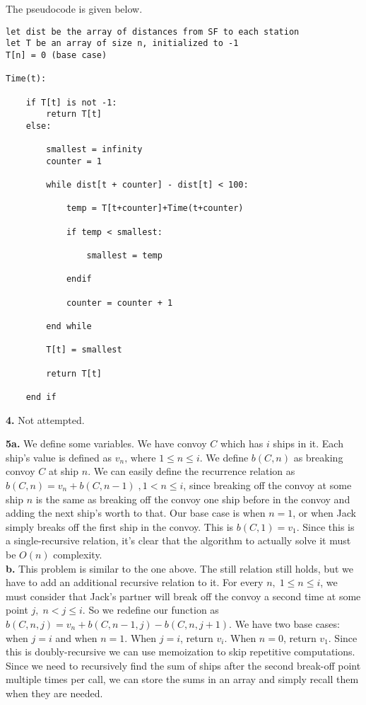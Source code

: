 \documentclass[12pt]{report}
\newcommand{\no}{\noindent}
\begin{document}
	\pagebreak

	\no The pseudocode is given below.
	
	\begin{lstlisting}
let dist be the array of distances from SF to each station 
let T be an array of size n, initialized to -1
T[n] = 0 (base case)

Time(t):

	if T[t] is not -1:
		return T[t]
	else:
		
		smallest = infinity
		counter = 1
		
		while dist[t + counter] - dist[t] < 100:
		
			temp = T[t+counter]+Time(t+counter)
			
			if temp < smallest:
				
				smallest = temp
				
			endif
			
			counter = counter + 1
			
		end while
		
		T[t] = smallest
		
		return T[t]
		
	end if
	\end{lstlisting}

	\no \textbf{4.} Not attempted.\\
	
	\pagebreak
	
	\no \textbf{5a.} We define some variables. We have convoy $C$ which has $i$ ships in it. Each ship's value is defined as $v_n\text{, where }1 \leq n \leq i.$ We define $b(C,n)$ as breaking convoy $C$ at ship $n$. We can easily define the recurrence relation as $b(C,n) = v_n + b(C,n-1)\; , 1 < n \leq i$, since breaking off the convoy at some ship $n$ is the same as breaking off the convoy one ship before in the convoy and adding the next ship's worth to that. Our base case is when $n=1$, or when Jack simply breaks off the first ship in the convoy. This is $b(C,1) = v_1$. Since this is a single-recursive relation, it's clear that the algorithm to actually solve it must be $O(n)$ complexity.\\

	\no \textbf{b.} This problem is similar to the one above. The still relation still holds, but we have to add an additional recursive relation to it. For every $n,\;1 \leq n \leq i$, we must consider that Jack's partner will break off the convoy a second time at some point $j,\; n < j \leq i$. So we redefine our function as $b(C, n, j) = v_n + b(C,n-1,j) - b(C,n,j+1)$. We have two base cases: when $j=i$ and when $n=1$. When $j = i$, return $v_i$. When $n = 0$, return $v_1$. Since this is doubly-recursive we can use memoization to skip repetitive computations. Since we need to recursively find the sum of ships after the second break-off point multiple times per call, we can store the sums in an array and simply recall them when they are needed.
\end{document}
